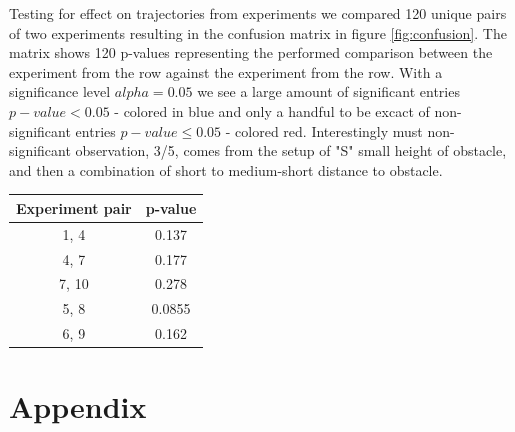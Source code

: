 \documentclass{article}
\begin{document}
Testing for effect on trajectories from experiments we compared 120 unique pairs of two experiments resulting in the confusion matrix in figure \ref{fig:confusion}. The matrix shows 120 p-values representing the performed comparison between the experiment from the row against the experiment from the row. With a significance level $alpha = 0.05$ we see a large amount of significant entries $p-value < 0.05$ - colored in blue and only a handful to be excact of non-significant entries $p-value \leq 0.05$ - colored red. Interestingly must non-significant observation, 3/5, comes from the setup of "S" small height of obstacle, and then a combination of short to medium-short distance to obstacle.

\begin{minipage}{\linewidth}
\centering
{}
\begin{tabular}{cc}\toprule[1.5pt]
\textbf{Experiment pair} & \textbf{p-value} \\\midrule[1.25pt]
1, 4         	& 0.137            \\\midrule
4, 7  		& 0.177            \\\midrule
7, 10           	& 0.278            \\\midrule
5, 8        	& 0.0855           \\\midrule
6, 9      	& 0.162           \\\bottomrule[1.25pt]
\end{tabular}
\label{tab:sig}
\end{minipage}

\section{Appendix}
\end{document}

